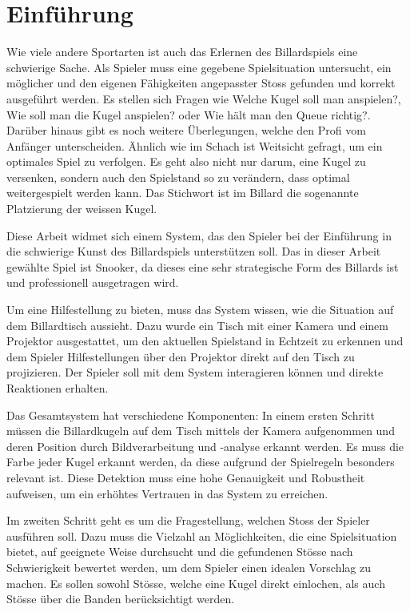 \chapter{Einführung}\label{kap:introduction}
Wie viele andere Sportarten ist auch das Erlernen des Billardspiels eine schwierige Sache.
Als Spieler muss eine gegebene Spielsituation untersucht, ein möglicher und den eigenen Fähigkeiten angepasster Stoss
gefunden und korrekt ausgeführt werden.
Es stellen sich Fragen wie \glqq Welche Kugel soll man anspielen?\grqq{},
\glqq Wie soll man die Kugel anspielen?\grqq{} oder \glqq Wie hält man den Queue richtig?\grqq{}.
Darüber hinaus gibt es noch weitere Überlegungen, welche den Profi vom Anfänger unterscheiden.
Ähnlich wie im Schach ist Weitsicht gefragt, um ein optimales Spiel zu verfolgen.
Es geht also nicht nur darum, eine Kugel zu versenken, sondern auch den Spielstand so zu verändern,
dass optimal weitergespielt werden kann.
Das Stichwort ist im Billard die sogenannte Platzierung der weissen Kugel.

Diese Arbeit widmet sich einem System, das den Spieler bei der Einführung in die schwierige Kunst des Billardspiels unterstützen soll.
Das in dieser Arbeit gewählte Spiel ist Snooker, da dieses eine sehr strategische Form des Billards ist und professionell ausgetragen wird.

Um eine Hilfestellung zu bieten, muss das System wissen, wie die Situation auf dem Billardtisch aussieht.
Dazu wurde ein Tisch mit einer Kamera und einem Projektor ausgestattet, um den aktuellen Spielstand in Echtzeit
zu erkennen und dem Spieler Hilfestellungen über den Projektor direkt auf den Tisch zu projizieren.
Der Spieler soll mit dem System interagieren können und direkte Reaktionen erhalten.

Das Gesamtsystem hat verschiedene Komponenten: In einem ersten Schritt müssen die Billardkugeln auf dem Tisch mittels der Kamera
aufgenommen und deren Position durch Bildverarbeitung und -analyse erkannt werden.
Es muss die Farbe jeder Kugel erkannt werden, da diese aufgrund der Spielregeln besonders relevant ist.
Diese Detektion muss eine hohe Genauigkeit und Robustheit aufweisen, um ein erhöhtes Vertrauen in das System zu erreichen.

Im zweiten Schritt geht es um die Fragestellung, welchen Stoss der Spieler ausführen soll.
Dazu muss die Vielzahl an Möglichkeiten, die eine Spielsituation bietet, auf geeignete Weise durchsucht und die gefundenen
Stösse nach Schwierigkeit bewertet werden, um dem Spieler einen idealen Vorschlag zu machen.
Es sollen sowohl Stösse, welche eine Kugel direkt einlochen, als auch Stösse über die Banden berücksichtigt werden.

